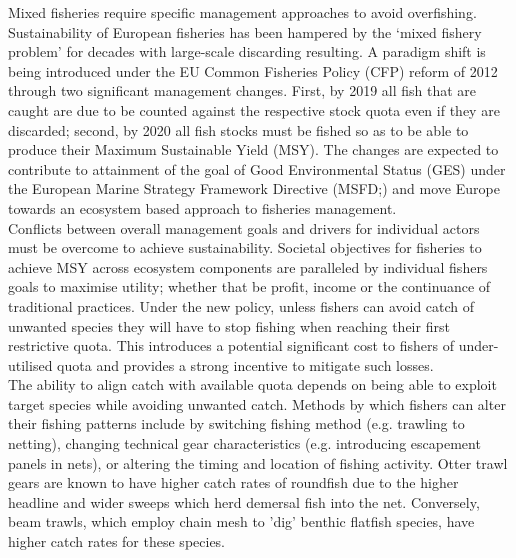 \documentclass[fleqn,10pt]{wlscirep}
\begin{document}
\begin{linenumbers}
Mixed fisheries require specific management approaches to avoid overfishing.
Sustainability of European fisheries has been hampered by the `mixed fishery
problem' for decades with large-scale discarding resulting\cite{Borges2015,
	Uhlmann2014}.  A paradigm shift is being introduced under the EU Common
Fisheries Policy (CFP) reform of 2012 through two significant management
changes.  First, by 2019 all fish that are caught are due to be counted against
the respective stock quota even if they are discarded; second, by 2020 all fish
stocks must be fished so as to be able to produce their Maximum Sustainable
Yield (MSY)\cite{EuropeanParliamentandCounciloftheEuropeanUnion2013}. The
changes are expected to contribute to attainment of the goal of Good
Environmental Status (GES) under the European Marine Strategy Framework
Directive (MSFD;\cite{EuropeanParliament2008}) and move Europe towards an
ecosystem based approach to fisheries management\cite{Garcia2003}. \\

Conflicts between overall management goals and drivers for individual actors
must be overcome to achieve sustainability. Societal objectives for fisheries
to achieve MSY across ecosystem components are paralleled by individual fishers
goals to maximise utility; whether that be profit, income or the continuance of
traditional practices.  Under the new policy,
unless fishers can avoid catch of unwanted species they will have to stop
fishing when reaching their first restrictive quota. This introduces a
potential significant cost to fishers of under-utilised quota\cite{Hoff2010a,
	Ulrich2016} and provides a strong incentive to mitigate such
losses\cite{Condie2013, Condie2013a}. \\

The ability to align catch with available quota depends on being able to
exploit target species while avoiding unwanted catch. Methods by which fishers
can alter their fishing patterns include by switching fishing method (e.g.
trawling to netting), changing technical gear characteristics (e.g.
introducing escapement panels in nets), or altering the timing and location of
fishing activity\cite{Fulton2011b, vanPutten2012a}.   Otter trawl gears are known to have higher catch rates of
roundfish due to the higher headline and wider sweeps which herd demersal fish
into the net.  Conversely, beam trawls, which employ chain mesh to 'dig'
benthic flatfish species, have higher catch rates for these
species\cite{Fraser2008}.  \\


\end{linenumbers}
\end{document}
